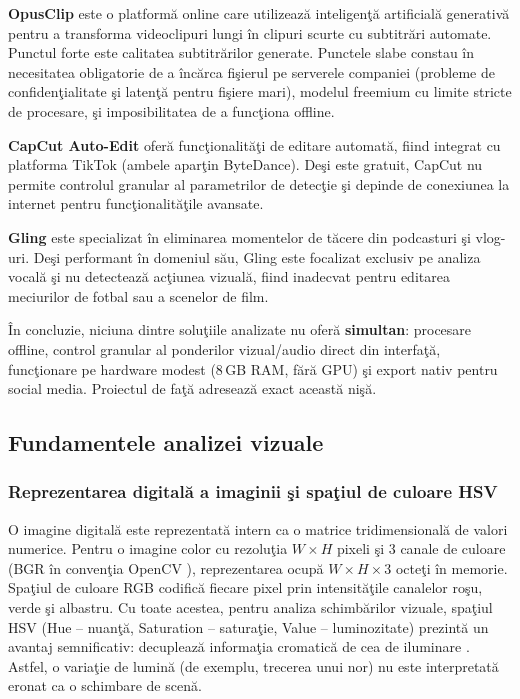 \documentclass[12pt,a4paper]{article}
\begin{document}
\textbf{OpusClip} \cite{opusclip2026} este o platform\u{a}{} online care utilizeaz\u{a}{} inteligen\c{t}\u{a}{} artificial\u{a}{} generativ\u{a}{} pentru a transforma videoclipuri lungi \^{i}n clipuri scurte cu subtit\-r\u{a}ri automate. Punctul forte este calitatea subtit\-r\u{a}rilor generate. Punctele slabe constau \^{i}n necesitatea obligatorie de a \^{i}nc\u{a}rca fi\c{s}ierul pe serverele companiei (probleme de confiden\c{t}ialitate \c{s}i laten\c{t}\u{a}{} pentru fi\c{s}iere mari), modelul freemium cu limite stricte de procesare, \c{s}i imposibilitatea de a func\c{t}iona offline.

\textbf{CapCut Auto-Edit} \cite{capcut2026} ofer\u{a}{} func\c{t}ionalit\u{a}\c{t}i de editare automat\u{a}, fiind integrat cu platforma TikTok (ambele apar\c{t}in ByteDance). De\c{s}i este gratuit, CapCut nu permite controlul granular al parametrilor de detec\c{t}ie \c{s}i depinde de conexiunea la internet pentru func\c{t}ionalit\u{a}\c{t}ile avansate.

\textbf{Gling} \cite{gling2026} este specializat \^{i}n eliminarea momentelor de t\u{a}cere din podcasturi \c{s}i vlog-uri. De\c{s}i performant \^{i}n domeniul s\u{a}u, Gling este focalizat exclusiv pe analiza vocal\u{a}{} \c{s}i nu detecteaz\u{a}{} ac\c{t}iunea vizual\u{a}, fiind inadecvat pentru editarea meciurilor de fotbal sau a scenelor de film.

\^{I}n concluzie, niciuna dintre solu\c{t}iile analizate nu ofer\u{a}{} \textbf{simultan}: procesare offline, control granular al ponderilor vizual/audio direct din interfa\c{t}\u{a}, func\c{t}ionare pe hardware modest (8\,GB RAM, f\u{a}r\u{a}{} GPU) \c{s}i export nativ pentru social media. Proiectul de fa\c{t}\u{a}{} adreseaz\u{a}{} exact aceast\u{a}{} ni\c{s}\u{a}.

\subsection{Fundamentele analizei vizuale}

\subsubsection{Reprezentarea digital\u{a}{} a imaginii \c{s}i spa\c{t}iul de culoare HSV}

O imagine digital\u{a}{} este reprezentat\u{a}{} intern ca o matrice tridimensional\u{a}{} de valori numerice. Pentru o imagine color cu rezolu\c{t}ia $W \times H$ pixeli \c{s}i 3 canale de culoare (BGR \^{i}n conven\c{t}ia OpenCV \cite{opencv2000}), reprezentarea ocup\u{a}{} $W \times H \times 3$ octe\c{t}i \^{i}n memorie. Spa\c{t}iul de culoare RGB codific\u{a}{} fiecare pixel prin intensit\u{a}\c{t}ile canalelor ro\c{s}u, verde \c{s}i albastru. Cu toate acestea, pentru analiza schimb\u{a}rilor vizuale, spa\c{t}iul HSV (Hue -- nuan\c{t}\u{a}, Saturation -- satura\c{t}ie, Value -- luminozitate) prezint\u{a}{} un avantaj semnificativ: decupleaz\u{a}{} informa\c{t}ia cromatic\u{a}{} de cea de iluminare \cite{opencv2000}. Astfel, o varia\c{t}ie de lumin\u{a}{} (de exemplu, trecerea unui nor) nu este interpretat\u{a}{} eronat ca o schimbare de scen\u{a}.
\end{document}
